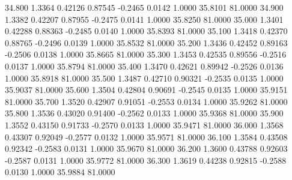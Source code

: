   34.800   1.3364   0.42126   0.87545  -0.2465   0.0142   1.0000  35.8101  81.0000
  34.900   1.3382   0.42207   0.87955  -0.2475   0.0141   1.0000  35.8250  81.0000
  35.000   1.3401   0.42288   0.88363  -0.2485   0.0140   1.0000  35.8393  81.0000
  35.100   1.3418   0.42370   0.88765  -0.2496   0.0139   1.0000  35.8532  81.0000
  35.200   1.3436   0.42452   0.89163  -0.2506   0.0138   1.0000  35.8665  81.0000
  35.300   1.3453   0.42535   0.89556  -0.2516   0.0137   1.0000  35.8794  81.0000
  35.400   1.3470   0.42621   0.89942  -0.2526   0.0136   1.0000  35.8918  81.0000
  35.500   1.3487   0.42710   0.90321  -0.2535   0.0135   1.0000  35.9037  81.0000
  35.600   1.3504   0.42804   0.90691  -0.2545   0.0135   1.0000  35.9151  81.0000
  35.700   1.3520   0.42907   0.91051  -0.2553   0.0134   1.0000  35.9262  81.0000
  35.800   1.3536   0.43020   0.91400  -0.2562   0.0133   1.0000  35.9368  81.0000
  35.900   1.3552   0.43150   0.91733  -0.2570   0.0133   1.0000  35.9471  81.0000
  36.000   1.3568   0.43307   0.92049  -0.2577   0.0132   1.0000  35.9571  81.0000
  36.100   1.3584   0.43508   0.92342  -0.2583   0.0131   1.0000  35.9670  81.0000
  36.200   1.3600   0.43788   0.92603  -0.2587   0.0131   1.0000  35.9772  81.0000
  36.300   1.3619   0.44238   0.92815  -0.2588   0.0130   1.0000  35.9884  81.0000
